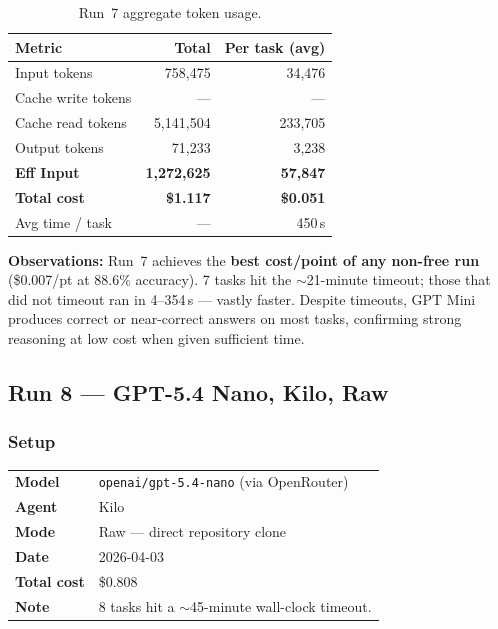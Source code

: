 \begin{table}[h]
\centering
\caption{Run~7 aggregate token usage.}\label{tab:r7-tokens}
\begin{tabular}{lrr}
\toprule
\textbf{Metric} & \textbf{Total} & \textbf{Per task (avg)} \\
\midrule
Input tokens         & 758,475    & 34,476 \\
Cache write tokens   & ---        & --- \\
Cache read tokens    & 5,141,504  & 233,705 \\
Output tokens        & 71,233     & 3,238  \\
\midrule
\textbf{Eff Input}   & \textbf{1,272,625} & \textbf{57,847} \\
\textbf{Total cost}  & \textbf{\$1.117}   & \textbf{\$0.051} \\
Avg time / task      & ---         & 450\,s \\
\bottomrule
\end{tabular}
\end{table}

\noindent
\textbf{Observations:} Run~7 achieves the \textbf{best cost/point of any
non-free run} (\$0.007/pt at 88.6\% accuracy).
7 tasks hit the $\sim$21-minute timeout; those that did not timeout ran in
4--354\,s --- vastly faster.
Despite timeouts, GPT Mini produces correct or near-correct answers on
most tasks, confirming strong reasoning at low cost when given sufficient time.

\subsection{Run 8 --- GPT-5.4 Nano, Kilo, Raw}
\label{sec:run8}

\subsubsection{Setup}

\begin{tabular}{ll}
\textbf{Model}     & \texttt{openai/gpt-5.4-nano} (via OpenRouter) \\
\textbf{Agent}     & Kilo \\
\textbf{Mode}      & Raw --- direct repository clone \\
\textbf{Date}      & 2026-04-03 \\
\textbf{Total cost} & \$0.808 \\
\textbf{Note}      & 8 tasks hit a $\sim$45-minute wall-clock timeout. \\
\end{tabular}

